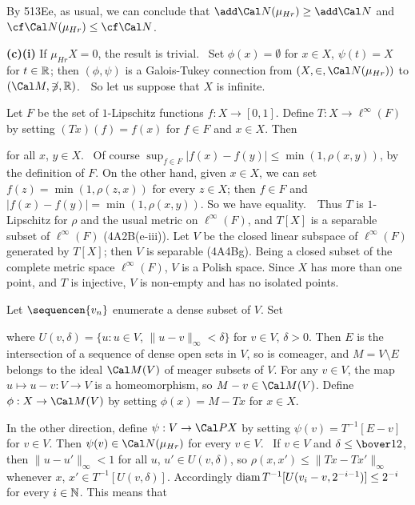 {\medskip

 By 513Ee, as usual, we can conclude that
$\add\Cal N(\mu_{Hr})\ge\add\Cal N$ and
$\cf\Cal N(\mu_{Hr})\le\cf\Cal N$.

\medskip

{\bf (c)(i)} If $\mu_{Hr}X=0$, the result is trivial.   \Prf\
Set $\phi(x)=\emptyset$ for $x\in X$, $\psi(t)=X$ for
$t\in\Bbb R$;  then $(\phi,\psi)$ is a Galois-Tukey connection from
$(X,\in,\Cal N(\mu_{Hr}))$ to $(\Cal M,\not\ni,\Bbb R)$.\ \QeD\  So
let
us suppose that $X$ is infinite.

\medskip

 Let $F$ be the set of $1$-Lipschitz functions
$f:X\to[0,1]$.   Define $T:X\to\ell^{\infty}(F)$ by setting
$(Tx)(f)=f(x)$ for $f\in F$ and $x\in X$.   Then


\noindent for all $x$, $y\in X$.   \Prf\ Of course
$\sup_{f\in F}|f(x)-f(y)|\le\min(1,\rho(x,y))$, by the definition of
$F$.   On the other hand, given $x\in X$, we can set
$f(z)=\min(1,\rho(z,x))$ for every $z\in X$;  then $f\in F$ and
$|f(x)-f(y)|=\min(1,\rho(x,y))$.   So we have equality.\ \QeD\   Thus
$T$ is $1$-Lipschitz for $\rho$ and the usual metric on
$\ell^{\infty}(F)$, and $T[X]$ is a separable subset of
$\ell^{\infty}(F)$ (4A2B(e-iii)).   Let $V$ be the closed linear
subspace of $\ell^{\infty}(F)$ generated by $T[X]$;  then $V$ is
separable (4A4Bg).   Being a closed subset of the complete metric
space
$\ell^{\infty}(F)$, $V$ is a Polish space.   Since $X$ has more than
one
point, and $T$ is injective, $V$ is non-empty and has no isolated
points.

Let $\sequencen{v_n}$ enumerate a dense subset of $V$.   Set


\noindent where $U(v,\delta)=\{u:u\in V$, $\|u-v\|_{\infty}<\delta\}$
for $v\in V$, $\delta>0$.   Then $E$ is the intersection of a sequence
of dense open sets in $V$, so is comeager, and $M=V\setminus E$
belongs to the ideal $\Cal M(V)$ of meager subsets of $V$.
For any $v\in V$, the map $u\mapsto u-v:V\to V$ is a
homeomorphism, so $M-v\in\Cal M(V)$.   Define $\phi:X\to\Cal M(V)$ by
setting $\phi(x)=M-Tx$ for $x\in X$.

In the other direction, define $\psi:V\to\Cal PX$ by setting
$\psi(v)=T^{-1}[E-v]$ for $v\in V$.   Then $\psi(v)\in\Cal
N(\mu_{Hr})$
for every $v\in V$.   \Prf\ If $v\in V$ and $\delta\le\bover12$, then
$\|u-u'\|_{\infty}<1$ for all $u$, $u'\in U(v,\delta)$, so
$\rho(x,x')\le\|Tx-Tx'\|_{\infty}$ whenever $x$,
$x'\in T^{-1}[U(v,\delta)]$.   Accordingly
$\mathop{\text{diam}} T^{-1}[U(v_i-v,2^{-i-1})]\le 2^{-i}$ for every $i\in\Bbb N$.
This means that

}
